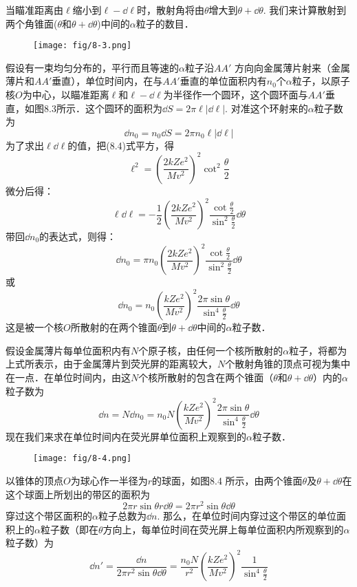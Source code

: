 当瞄准距离由$\ell$缩小到$\ell-\dd\ell$时，散射角将由$\theta$增大到$\theta+\dd\theta$. 我们来计算散射到两个角锥面($\theta$和$\theta+\dd\theta$)中间的$\alpha$粒子的数目．

\begin{figure}[htp]
    \centering
    \texttt{[image: fig/8-3.png]}
    \caption{}
\end{figure}

假设有一束均匀分布的，平行而且等速的$\alpha$粒子沿$AA'$
方向向金属薄片射来（金属薄片和$AA'$垂直），单位时间内，在与$AA'$垂直的单位面积内有$n_0$个$\alpha$粒子，以原子核$O$为中心，以瞄准距离$\ell$和$\ell-\dd\ell$为半径作一个圆环，这个圆环面与$AA'$垂直，如图8.3所示．这个圆环的面积为$\dd S=2\pi\ell|\dd\ell|$.
对准这个环射来的$\alpha$粒子数为
\[\dd n_0=n_0\dd S=2\pi n_0\ell|\dd\ell|\]
为了求出$\ell\dd\ell$的值，把(8.4)式平方，得
\[\ell^2=\left(\frac{2kZe^2}{Mv^2}\right)^2\cot^2\frac{\theta}{2}\]
微分后得：
\[\ell \dd \ell=-\frac{1}{2}\left(\frac{2kZe^2}{Mv^2}\right)^2\frac{\cot\frac{\theta}{2}}{\sin^2\frac{\theta}{2}}\dd\theta \]
带回$\dd n_0$的表达式，则得：
\[\dd n_0=\pi n_0\left(\frac{2kZe^2}{Mv^2}\right)^2\frac{\cot\frac{\theta}{2}}{\sin^2\frac{\theta}{2}}\dd\theta \]
或
\[\dd n_0=n_0\left(\frac{kZe^2}{Mv^2}\right)^2\frac{2\pi \sin\theta}{\sin^4\frac{\theta}{2}}\dd\theta\]
这是被一个核$O$所散射的在两个锥面$\theta$到$\theta+\dd \theta$中间的$\alpha$粒子数．

假设金属薄片每单位面积内有$N$个原子核，由任何一个核所散射的$\alpha$粒子，将都为上式所表示，由于金属薄片到荧光屏的距离较大，$N$个散射角锥的顶点可视为集中在一点．在单位时间内，由这$N$个核所散射的包含在两个锥面（$\theta$和$\theta+\dd\theta$）内的$\alpha$粒子数为
\begin{equation}
    \dd n=N\dd n_0=n_0N \left(\frac{kZe^2}{Mv^2}\right)^2\frac{2\pi \sin\theta}{\sin^4\frac{\theta}{2}}\dd\theta
\end{equation}
现在我们来求在单位时间内在荧光屏单位面积上观察到的$\alpha$粒子数．

\begin{figure}[htp]
    \centering
    \texttt{[image: fig/8-4.png]}
    \caption{}
\end{figure}

以锥体的顶点$O$为球心作一半径为$r$的球面，如图8.4
所示，由两个锥面$\theta$及$\theta+\dd\theta$在这个球面上所划出的带区的面积为
\[2\pi r\sin\theta r\dd\theta =2\pi r^2\sin\theta\dd\theta\]
穿过这个带区面积的$\alpha$粒子总数为$\dd n$. 那么，在单位时间内穿过这个带区的单位面积上的$\alpha$粒子数（即在$\theta$方向上，每单位时间在荧光屏上每单位面积内所观察到的$\alpha$粒子数）为
\begin{equation}
    \dd n'=\frac{\dd n}{2\pi r^2\sin\theta\dd\theta}=\frac{n_0 N}{r^2}\left(\frac{kZe^2}{Mv^2}\right)^2\frac{1}{\sin^4\frac{\theta}{2}}
\end{equation}

